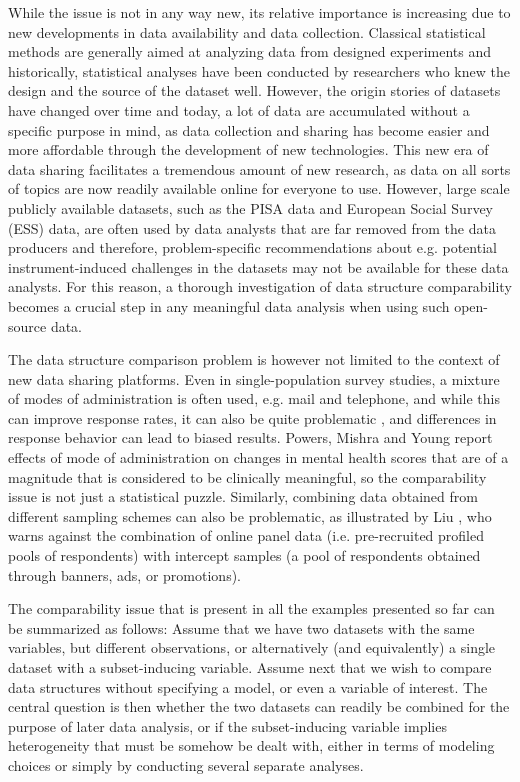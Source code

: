 \documentclass[titlepage,11pt,twoside]{article}
\begin{document}
While the issue is not in any way new, its relative importance is increasing due to new developments in data availability and data collection. Classical statistical methods are generally aimed at analyzing data from designed experiments and historically, statistical analyses have been conducted by researchers who knew the design and the source of the dataset well. However, the origin stories of datasets have changed over time and today, a lot of data are accumulated without a specific purpose in mind, as data collection and sharing has become easier and more affordable through the development of new technologies. This new era of data sharing facilitates a tremendous amount of new research, as data on all sorts of topics are now readily available online for %
everyone to use. However, large scale publicly available datasets, such as the PISA data and European Social Survey (ESS) data, are often used by data analysts that are far removed from the data producers and therefore, problem-specific recommendations about e.g. potential instrument-induced challenges in the datasets %
may not be available for these data analysts. For this reason, a thorough investigation of data structure comparability becomes a crucial step in any meaningful data analysis when using such open-source data. 

The data structure comparison problem is however not limited to the context of new data sharing platforms. Even in single-population survey studies, a mixture of modes of administration is often used, e.g. mail and telephone, and while this can improve response rates, it can also be quite problematic \citep{Brambilla1987, McHorney1994}, and differences in response behavior can lead to biased results. Powers, Mishra and Young \citeyearpar{Powers2005} report effects of mode of administration on changes in mental health scores that are of a magnitude that is considered to be clinically meaningful, so the comparability issue is not just a statistical puzzle. Similarly, combining data obtained from different sampling schemes can also be problematic, as illustrated by Liu \citeyearpar{Liu2016}, who warns against the combination of online panel data (i.e. pre-recruited profiled pools of respondents) with intercept samples (a pool of respondents obtained through banners, ads, or promotions). 

The comparability issue that is present in all the examples presented so far can be summarized as follows: Assume that we have two datasets with the same variables, but different observations, or alternatively (and equivalently) a single dataset with a subset-inducing variable. Assume next that we wish to compare data structures without specifying a model, or even a variable of interest. The central question is then whether the two datasets can readily be combined for the purpose of later data analysis, or if the subset-inducing variable implies heterogeneity that must be somehow be dealt with, either in terms of modeling choices or simply by conducting several separate analyses.
\end{document}

